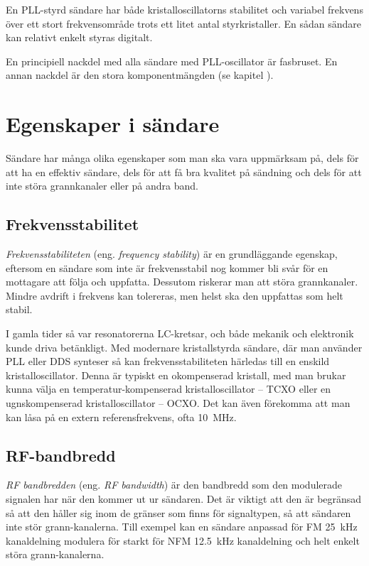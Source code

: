 En PLL-styrd sändare har både kristalloscillatorns stabilitet och variabel
frekvens över ett stort frekvensområde trots ett litet antal styrkristaller.
En sådan sändare kan relativt enkelt styras digitalt.

En principiell nackdel med alla sändare med PLL-oscillator är fasbruset.
En annan nackdel är den stora komponentmängden
(se kapitel ).

\section{Egenskaper i sändare}

Sändare har många olika egenskaper som man ska vara uppmärksam på, dels för
att ha en effektiv sändare, dels för att få bra kvalitet på sändning och dels
för att inte störa grannkanaler eller på andra band.

\subsection{Frekvensstabilitet}

\emph{Frekvensstabiliteten} (eng. \emph{frequency stability}) är en
grundläggande egenskap, eftersom en sändare som inte är frekvensstabil nog
kommer bli svår för en mottagare att följa och uppfatta.
Dessutom riskerar man att störa grannkanaler.
Mindre avdrift i frekvens kan tolereras, men helst ska den uppfattas som
helt stabil.

I gamla tider så var resonatorerna LC-kretsar, och både mekanik och elektronik
kunde driva betänkligt.
Med modernare kristallstyrda sändare, där man använder PLL eller DDS synteser så
kan frekvensstabiliteten härledas till en enskild kristalloscillator.
Denna är typiskt en okompenserad kristall, med man brukar kunna välja en
temperatur-kompenserad kristalloscillator -- TCXO eller en ugnskompenserad
kristalloscillator -- OCXO.
Det kan även förekomma att man kan låsa på en extern referensfrekvens,
ofta \qty{10}{\mega\hertz}.

\subsection{RF-bandbredd}

\emph{RF bandbredden} (eng. \emph{RF bandwidth}) är den bandbredd som den
modulerade signalen har när den kommer ut ur sändaren.
Det är viktigt att den är begränsad så att den håller sig inom de gränser
som finns för signaltypen, så att sändaren inte stör grann-kanalerna.
Till exempel kan en sändare anpassad för FM \qty{25}{\kilo\hertz} kanaldelning
modulera för starkt för NFM \qty{12,5}{\kilo\hertz} kanaldelning och helt enkelt
störa grann-kanalerna.

